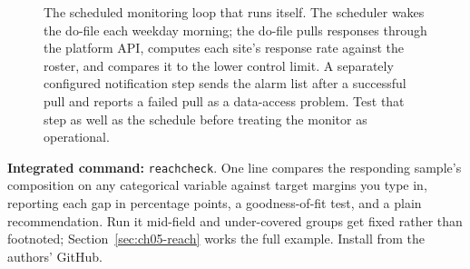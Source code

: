\begin{figure}[htbp]
\centering
{}
\caption[The scheduled monitoring loop]{The scheduled monitoring loop that runs itself. The scheduler wakes the do-file each weekday morning; the do-file pulls responses through the platform API, computes each site's response rate against the roster, and compares it to the lower control limit. A separately configured notification step sends the alarm list after a successful pull and reports a failed pull as a data-access problem. Test that step as well as the schedule before treating the monitor as operational.}
\label{fig:ch05-viz-cronloop}
\end{figure}

\begin{kaobox}[frametitle=Package Integration: \texttt{reachcheck}]
\textbf{Integrated command:} \texttt{reachcheck}. One line compares the responding sample's composition on any categorical variable against target margins you type in, reporting each gap in percentage points, a goodness-of-fit test, and a plain recommendation. Run it mid-field and under-covered groups get fixed rather than footnoted; Section~\ref{sec:ch05-reach} works the full example. Install from the authors' GitHub.
\end{kaobox}

